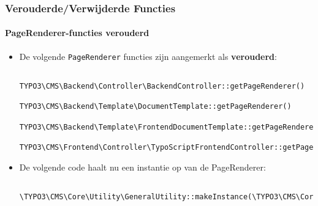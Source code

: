 \begin{frame}[fragile]
\begin{itemize}
	\end{itemize}

\end{frame}


\begin{frame}[fragile]
	\frametitle{Verouderde/Verwijderde Functies}
	\framesubtitle{PageRenderer-functies verouderd}

	\lstset{basicstyle=\tiny\ttfamily}

	\begin{itemize}
		\item De volgende \texttt{PageRenderer} functies zijn aangemerkt als \textbf{verouderd}:

			\begin{lstlisting}
				TYPO3\CMS\Backend\Controller\BackendController::getPageRenderer()
				TYPO3\CMS\Backend\Template\DocumentTemplate::getPageRenderer()
				TYPO3\CMS\Backend\Template\FrontendDocumentTemplate::getPageRenderer()
				TYPO3\CMS\Frontend\Controller\TypoScriptFrontendController::getPageRenderer()
			\end{lstlisting}

		\item De volgende code haalt nu een instantie op van de PageRenderer:

			\begin{lstlisting}
				\TYPO3\CMS\Core\Utility\GeneralUtility::makeInstance(\TYPO3\CMS\Core\Page\PageRenderer::class)
			\end{lstlisting}

	\end{itemize}

\end{frame}


